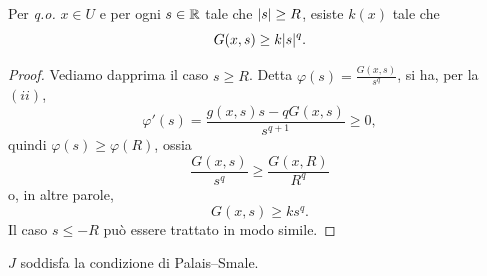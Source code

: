\begin{lemma}\label{lemma_tech_minorazioneG}
Per \emph{q.o.} $x \in U$ e per ogni $s \in \mathbb{R}$ tale che $\lvert s\rvert\ge R$, esiste $k(x)$ tale che
\[ G(x,s) \ge k \lvert s\rvert^q. \]
\end{lemma}
\begin{proof}
Vediamo dapprima il caso $s\ge R$. Detta $\varphi(s) = \frac{G(x,s)}{s^q}$, si ha, per la $(ii)$,
\[ \varphi'(s) = \frac{g(x,s)s-qG(x,s)}{s^{q+1}} \ge0, \]
quindi $\varphi(s) \ge \varphi(R)$, ossia
\[ \frac{G(x,s)}{s^q} \ge \frac{G(x,R)}{R^q} \]
o, in altre parole,
\[ G(x,s) \ge k s^q. \]
Il caso $s\le -R$ può essere trattato in modo simile.
\end{proof}
\begin{lemma}\label{Lemma_JPS}
$J$ soddisfa la condizione di Palais--Smale.
\end{lemma}
